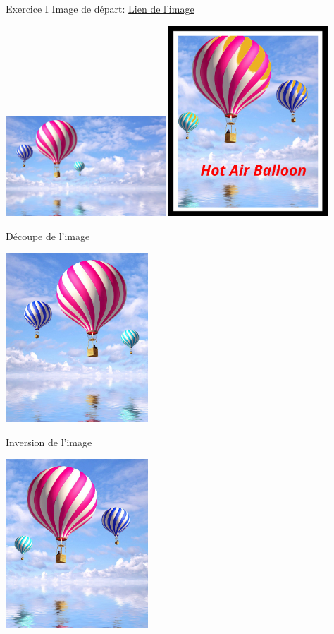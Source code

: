 \documentclass[10pt,svgnames,usenames,table]{beamer}
\begin{document}
\begin{frame}[allowframebreaks]{Exercice I}
	Image de départ: \href{http://louvainlinux.github.io/atelier-gimp/src/Images/ex1/original.jpg}{Lien de l'image}
	\begin{center}
	\includegraphics[width=0.45\textwidth]{Images/ex1/Ex1_step0.jpg}
	\includegraphics[width=0.45\textwidth]{Images/ex1/Ex1_step5.jpg}
	\end{center}
	\framebreak
	Découpe de l'image
	\begin{center}
		\includegraphics[width=0.4\textwidth]{Images/ex1/Ex1_step1.jpg}
	\end{center}
	\framebreak
	Inversion de l'image
	\begin{center}
		\includegraphics[width=0.4\textwidth]{Images/ex1/Ex1_step2.jpg}

\end{center}
\end{frame}
\end{document}
